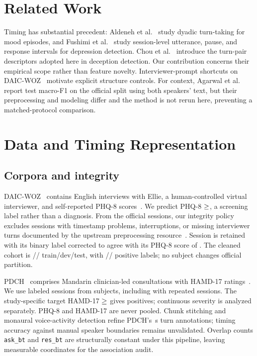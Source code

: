 \documentclass{article}
\begin{document}
\section{Related Work}
Timing has substantial precedent: Aldeneh et al.~\cite{aldeneh2019mood} study dyadic turn-taking for mood episodes, and Fushimi et al.~\cite{fushimi2026beyond} study session-level utterance, pause, and response intervals for depression detection. Chou et al.~\cite{chou2019joint,chou2021automatic} introduce the turn-pair descriptors adopted here in deception detection. Our contribution concerns their empirical scope rather than feature novelty. Interviewer-prompt shortcuts on DAIC-WOZ~\cite{burdisso2024prompts} motivate explicit structure controls. For context, Agarwal et al.~\cite{agarwal2024discourse} report test macro-F1  on the official split using both speakers' text, but their preprocessing and modeling differ and the method is not rerun here, preventing a matched-protocol comparison.

\section{Data and Timing Representation}
\subsection{Corpora and integrity}
DAIC-WOZ~\cite{gratch2014daic} contains English interviews with Ellie, a human-controlled virtual interviewer, and self-reported PHQ-8 scores~\cite{kroenke2009phq8}. We predict PHQ-8 $\geq\R{phqCutoff}$, a screening label rather than a diagnosis. From the official  sessions, our integrity policy excludes  sessions with timestamp problems, interruptions, or missing interviewer turns documented by the upstream preprocessing resource~\cite{baileyDaicProcessing}. Session  is retained with its binary label corrected to agree with its PHQ-8 score of . The cleaned cohort is // train/dev/test, with // positive labels; no subject changes official partition.

PDCH~\cite{cao2025pdch} comprises Mandarin clinician-led consultations with HAMD-17 ratings~\cite{hamilton1960rating}. We use  labeled sessions from  subjects, including  with repeated sessions. The study-specific target HAMD-17 $\geq\R{hamdCutoff}$ gives  positives; continuous severity is analyzed separately. PHQ-8 and HAMD-17 are never pooled. Chunk stitching and monaural voice-activity detection refine PDCH's \,s turn annotations; timing accuracy against manual speaker boundaries remains unvalidated. Overlap counts \texttt{ask\_bt} and \texttt{res\_bt} are structurally constant under this pipeline, leaving  measurable coordinates for the association audit.
\end{document}
